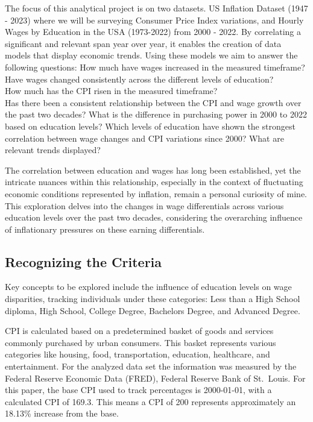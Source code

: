 \documentclass[
  letterpaper,
  DIV=11,
  numbers=noendperiod]{scrartcl}
\begin{document}
The focus of this analytical project is on two datasets. US Inflation
Dataset (1947 - 2023) where we will be surveying Consumer Price Index
variations, and Hourly Wages by Education in the USA (1973-2022) from
2000 - 2022. By correlating a significant and relevant span year over
year, it enables the creation of data models that display economic
trends. Using these models we aim to answer the following questions: How
much have wages increased in the measured timeframe? Have wages changed
consistently across the different levels of education?\\
How much has the CPI risen in the measured timeframe?\\
Has there been a consistent relationship between the CPI and wage growth
over the past two decades? What is the difference in purchasing power in
2000 to 2022 based on education levels? Which levels of education have
shown the strongest correlation between wage changes and CPI variations
since 2000? What are relevant trends displayed?

The correlation between education and wages has long been established,
yet the intricate nuances within this relationship, especially in the
context of fluctuating economic conditions represented by inflation,
remain a personal curiosity of mine. This exploration delves into the
changes in wage differentials across various education levels over the
past two decades, considering the overarching influence of inflationary
pressures on these earning differentials.

\hypertarget{recognizing-the-criteria}{%
\subsection{Recognizing the Criteria}\label{recognizing-the-criteria}}

Key concepts to be explored include the influence of education levels on
wage disparities, tracking individuals under these categories: Less than
a High School diploma, High School, College Degree, Bachelors Degree,
and Advanced Degree.

CPI is calculated based on a predetermined basket of goods and services
commonly purchased by urban consumers. This basket represents various
categories like housing, food, transportation, education, healthcare,
and entertainment. For the analyzed data set the information was
measured by the Federal Reserve Economic Data (FRED), Federal Reserve
Bank of St.~Louis. For this paper, the base CPI used to track
percentages is 2000-01-01, with a calculated CPI of 169.3. This means a
CPI of 200 represents approximately an 18.13\% increase from the base.
\end{document}
